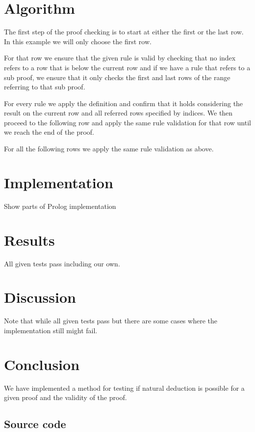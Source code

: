 \documentclass[a4paper,11pt]{article}
\begin{document}
\section{Algorithm}
The first step of the proof checking is to start at either the first or the last row. In this example we will only choose the first row.

For that row we ensure that the given rule is valid by checking that no index refers to a row that is below the current row and if we have a rule that refers to a sub proof, we ensure that it only checks the first and last rows of the range referring to that sub proof.

For every rule we apply the definition and confirm that it holds considering the result on the current row and all referred rows specified by indices. We then proceed to the following row and apply the same rule validation for that row until we reach the end of the proof.

For all the following rows we apply the same rule validation as above.
\section{Implementation}
Show parts of Prolog implementation
\section{Results}
All given tests pass including our own.
\section{Discussion}
Note that while all given tests pass but there are some cases where the implementation still might fail.
\section{Conclusion}
We have implemented a method for testing if natural deduction is possible for a given proof and the validity of the proof.
\newpage
\begin{appendices}
\section{Source code}

\end{appendices}
\end{document}
